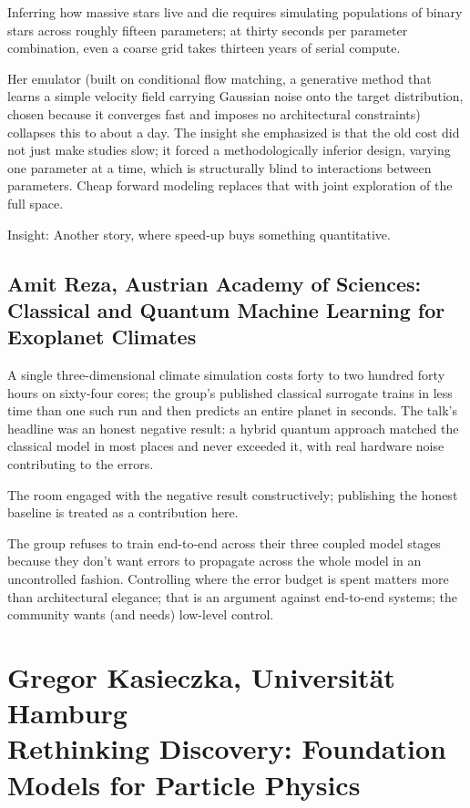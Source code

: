 \documentclass[11pt]{article}
\begin{document}
Inferring how massive stars live and die requires simulating populations of binary stars across roughly fifteen parameters; at thirty seconds per parameter combination, even a coarse grid takes thirteen years of serial compute.

Her emulator (built on conditional flow matching, a generative method that learns a simple velocity field carrying Gaussian noise onto the target distribution, chosen because it converges fast and imposes no architectural constraints) collapses this to about a day. The insight she emphasized is that the old cost did not just make studies slow; it forced a methodologically inferior design, varying one parameter at a time, which is structurally blind to interactions between parameters. Cheap forward modeling replaces that with joint exploration of the full space.

Insight: Another story, where speed-up buys something quantitative.

\subsection*{Amit Reza, Austrian Academy of Sciences: Classical and Quantum Machine Learning for Exoplanet Climates}

A single three-dimensional climate simulation costs forty to two hundred forty hours on sixty-four cores; the group's published classical surrogate trains in less time than one such run and then predicts an entire planet in seconds. The talk's headline was an honest negative result: a hybrid quantum approach matched the classical model in most places and never exceeded it, with real hardware noise contributing to the errors.

The room engaged with the negative result constructively; publishing the honest baseline is treated as a contribution here.

The group refuses to train end-to-end across their three coupled model stages because they don't want errors to propagate across the whole model in an uncontrolled fashion. Controlling where the error budget is spent matters more than architectural elegance; that is an argument against end-to-end systems; the community wants (and needs) low-level control.

\section{Gregor Kasieczka, Universit\"at Hamburg\\
Rethinking Discovery: Foundation Models for Particle Physics}
\end{document}
